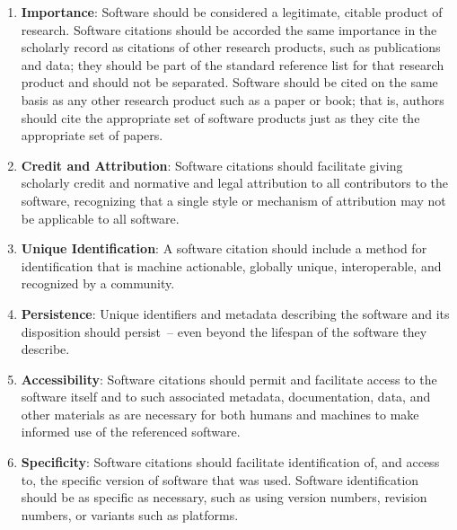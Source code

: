 \documentclass[11pt, oneside]{amsart}
\begin{document}
\begin{enumerate}
\item \textbf{Importance}: \label{principle:importance}
Software should be considered a legitimate, citable product of research.
Software citations should be accorded the same importance in the scholarly record as citations of other research products, such as publications and data; they should be part of the standard reference list for that research product and should not be separated.
Software should be cited on the same basis as any other research product such as a paper or book; that is, authors should cite the appropriate set of software products just as they cite the appropriate set of papers.
\item \textbf{Credit and Attribution}: \label{principle:credit}
Software citations should facilitate giving scholarly credit and normative
and legal attribution to all contributors to the software, recognizing
that a single style or mechanism of attribution may not be applicable to
all software.
\item \textbf{Unique Identification}: \label{principle:uid}
A software citation should include a method for identification that is
machine actionable, globally unique, interoperable, and recognized by
a community.
\item \textbf{Persistence}: \label{principle:persistence}
Unique identifiers and metadata describing the software and its disposition should persist~-- even beyond the lifespan of the software they describe.
\item \textbf{Accessibility}: \label{principle:accessibility}
Software citations should permit and facilitate access to the software itself and to such associated metadata, documentation, data, and other materials as are necessary for both humans and machines to make informed use of the referenced software.
\item \textbf{Specificity}:
Software citations should facilitate identification of, and access to, the specific version of software that was used.  Software identification should be as specific as necessary, such as using version numbers, revision numbers, or variants such as platforms.
\end{enumerate}
\end{document}
